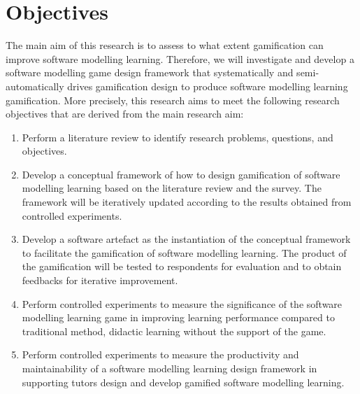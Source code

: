 \documentclass[12pt, a4paper]{report}
\begin{document}
{\section{Objectives}
The main aim of this research is to assess to what extent gamification can improve software modelling learning. Therefore, we will investigate and develop a software modelling game design framework that systematically and semi-automatically drives gamification design to produce software modelling learning gamification. More precisely, this research aims to meet the following research objectives that are derived from the main research aim:

\begin{enumerate}
\item Perform a literature review to identify research problems, questions, and objectives. 
\item Develop a conceptual framework of how to design gamification of software modelling learning based on the literature review and the survey. The framework will be iteratively updated according to the results obtained from controlled experiments. 
\item Develop a software artefact as the instantiation of the conceptual framework to facilitate the gamification of software modelling learning. The product of the gamification will be tested to respondents for evaluation and to obtain feedbacks for iterative improvement. 
\item Perform controlled experiments to measure the significance of the software modelling learning game in improving learning performance compared to traditional method, didactic learning without the support of the game.
\item Perform controlled experiments to measure the productivity and maintainability of a software modelling learning design framework in supporting tutors design and develop gamified software modelling learning. 
\end{enumerate}

}
\end{document}
